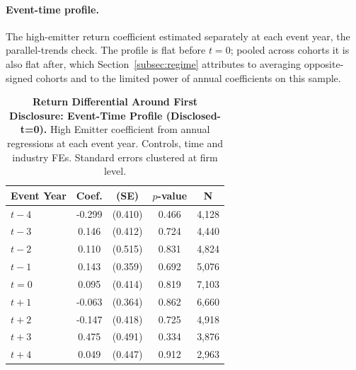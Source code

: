 \documentclass[a4paper,12pt]{article}
\begin{document}
\clearpage

\paragraph{Event-time profile.} The high-emitter return coefficient estimated
separately at each event year, the parallel-trends check. The profile is flat
before $t=0$; pooled across cohorts it is also flat after, which
Section~\ref{subsec:regime} attributes to averaging opposite-signed cohorts and to
the limited power of annual coefficients on this sample.

\begin{table}[htbp]
\footnotesize\centering
\caption{\textbf{Return Differential Around First Disclosure: Event-Time Profile (Disclosed-t=0).}
High Emitter coefficient from annual regressions at each event year.
Controls, time and industry FEs. Standard errors clustered at firm level.}
\label{tab:returns_eventtime_disc}
\begin{tabular}{lcccc}
\toprule
Event Year & Coef. & (SE) & $p$-value & N \\
\midrule
$t-4$ & -0.299 & (0.410) & 0.466 & 4,128 \\
$t-3$ & 0.146 & (0.412) & 0.724 & 4,440 \\
$t-2$ & 0.110 & (0.515) & 0.831 & 4,824 \\
$t-1$ & 0.143 & (0.359) & 0.692 & 5,076 \\
$t=0$ & 0.095 & (0.414) & 0.819 & 7,103 \\
$t+1$ & -0.063 & (0.364) & 0.862 & 6,660 \\
$t+2$ & -0.147 & (0.418) & 0.725 & 4,918 \\
$t+3$ & 0.475 & (0.491) & 0.334 & 3,876 \\
$t+4$ & 0.049 & (0.447) & 0.912 & 2,963 \\
\bottomrule
\end{tabular}
\end{table}
\end{document}
